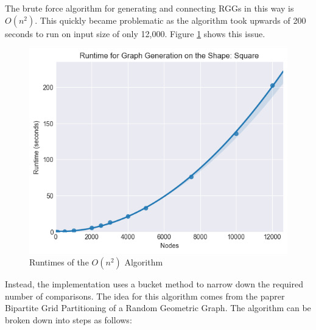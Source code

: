 \documentclass{article}
\begin{document}
    The brute force algorithm for generating and connecting RGGs in this way is $O(n^2)$.
    This quickly became problematic as the algorithm took upwards of 200 seconds to run on input size of only 12,000.
    Figure \ref{brute_force_runtimes} shows this issue.
    \begin{figure}
      \centering
      \label{brute_force_runtimes}
      \includegraphics[width=1 \textwidth]{square/generation/runtime/runtime_chart_naive}
      \caption{Runtimes of the $O(n^2)$ Algorithm}
    \end{figure}
    Instead, the implementation uses a bucket method to narrow down the required number of comparisons.
    The idea for this algorithm comes from the paprer Bipartite Grid Partitioning of a Random Geometric Graph\cite{chen2017bipartite}.
    The algorithm can be broken down into steps as follows:
\end{document}
